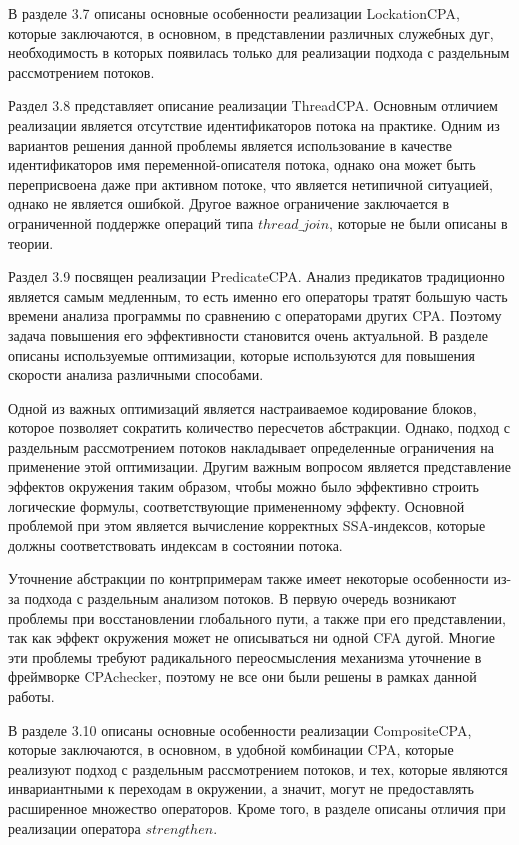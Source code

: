 В разделе 3.7 описаны основные особенности реализации LockationCPA, которые заключаются, в основном, в представлении различных служебных дуг, необходимость в которых появилась только для реализации подхода с раздельным рассмотрением потоков.

Раздел 3.8 представляет описание реализации ThreadCPA.
Основным отличием реализации является отсутствие идентификаторов потока на практике. 
Одним из вариантов решения данной проблемы является использование в качестве идентификаторов имя переменной-описателя потока, однако она может быть переприсвоена даже при активном потоке, что является нетипичной ситуацией, однако не является ошибкой.
Другое важное ограничение заключается в ограниченной поддержке операций типа $thread\_join$, которые не были описаны в теории.

Раздел 3.9 посвящен реализации PredicateCPA.
Анализ предикатов традиционно является самым медленным, то есть именно его операторы тратят большую часть времени анализа программы по сравнению с операторами других CPA.
Поэтому задача повышения его эффективности становится очень актуальной.
В разделе описаны используемые оптимизации, которые используются для повышения скорости анализа различными способами.

Одной из важных оптимизаций является настраиваемое кодирование блоков, которое позволяет сократить количество пересчетов абстракции. 
Однако, подход с раздельным рассмотрением потоков накладывает определенные ограничения на применение этой оптимизации.
Другим важным вопросом является представление эффектов окружения таким образом, чтобы можно было эффективно строить логические формулы, соответствующие примененному эффекту.
Основной проблемой при этом является вычисление корректных SSA-индексов, которые должны соответствовать индексам в состоянии потока.

Уточнение абстракции по контрпримерам также имеет некоторые особенности из-за подхода с раздельным анализом потоков.
В первую очередь возникают проблемы при восстановлении глобального пути, а также при его представлении, так как эффект окружения может не описываться ни одной CFA дугой.
Многие эти проблемы требуют радикального переосмысления механизма уточнение в фреймворке CPAchecker, поэтому не все они были решены в рамках данной работы.

В разделе 3.10 описаны основные особенности реализации CompositeCPA, которые заключаются, в основном, в удобной комбинации CPA, которые реализуют подход с раздельным рассмотрением потоков, и тех, которые являются инвариантными к переходам в окружении, а значит, могут не предоставлять расширенное множество операторов. 
Кроме того, в разделе описаны отличия при реализации оператора $strengthen$.

